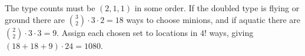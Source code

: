 The type counts must be $(2,1,1)$ in some order. If the doubled type is flying or ground there are $\binom32\cdot3\cdot2=18$ ways to choose minions, and if aquatic there are $\binom22\cdot3\cdot3=9$. Assign each chosen set to locations in $4!$ ways, giving $(18+18+9)\cdot24=\boxed{1080}$.
